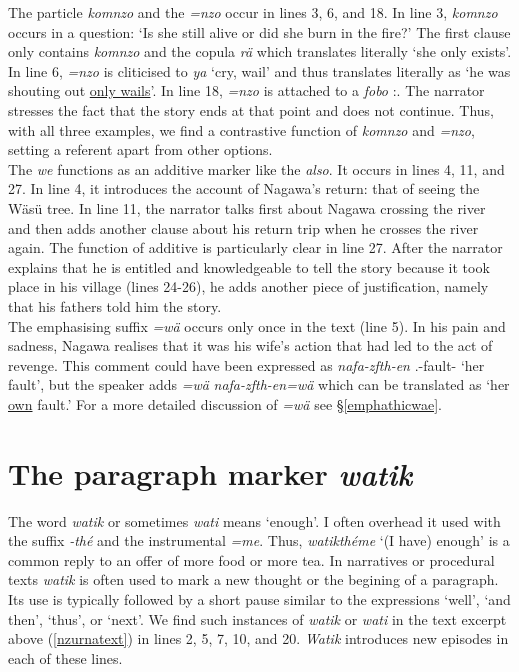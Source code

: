 The particle \emph{komnzo} and the  \emph{=nzo} occur in lines 3, 6, and 18. In line 3, \emph{komnzo} occurs in a question: `Is she still alive or did she burn in the fire?' The first clause only contains \emph{komnzo} and the copula \emph{rä} which translates literally `she only exists'. In line 6, \emph{=nzo} is cliticised to \emph{ya} `cry, wail' and thus translates literally as `he was shouting out \underline{only wails}'. In line 18, \emph{=nzo} is attached to a  \emph{fobo} \Dist:\All{}. The narrator stresses the fact that the story ends at that point and does not continue. Thus, with all three examples, we find a contrastive function of \emph{komnzo} and \emph{=nzo}, setting a referent apart from other options.\\

The  \emph{we} functions as an additive marker like the   \emph{also}. It occurs in lines 4, 11, and 27. In line 4, it introduces the account of Nagawa's return: that of seeing the Wäsü tree. In line 11, the narrator talks first about Nagawa crossing the river and then adds another clause about his return trip when he crosses the river again. The function of additive  is particularly clear in line 27. After the narrator explains that he is entitled and knowledgeable to tell the story because it took place in his village (lines 24-26), he adds another piece of justification, namely that his fathers told him the story.\\

The emphasising suffix \emph{=wä} occurs only once in the text (line 5). In his pain and sadness, Nagawa realises that it was his wife's action that had led to the act of revenge. This comment could have been expressed as \emph{nafa-zfth-en} \Third.\Poss-fault-\Loc{} `her fault', but the speaker adds \emph{=wä} \emph{nafa-zfth-en=wä} which can be translated as `her \underline{own} fault.' For a more detailed discussion of \emph{=wä} see \S{}\ref{emphathicwae}.

\section{The paragraph marker \emph{watik}} \label{watik}

The word \emph{watik} or sometimes \emph{wati} means `enough'. I often overhead it used with the  suffix \emph{-thé} and the instrumental \emph{=me}. Thus, \emph{watikthéme} `(I have) enough' is a common reply to an offer of more food or more tea. In narratives or procedural texts \emph{watik} is often used to mark a new thought or the begining of a paragraph. Its use is typically followed by a short pause similar to the  expressions `well', `and then', `thus', or `next'. We find such instances of \emph{watik} or \emph{wati} in the text excerpt above (\ref{nzurnatext}) in lines 2, 5, 7, 10, and 20. \emph{Watik} introduces new episodes in each of these lines.

